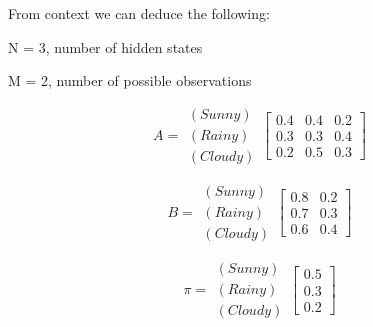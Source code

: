 \begin{example}
        From context we can deduce the following:
        \begin{center}
                    N = 3, number of hidden states

                    M = 2, number of possible observations

                    \begin{equation}
                    A = 
                    \begin{array}{c}
                        (Sunny) \\
                        (Rainy) \\
                        (Cloudy)
                    \end{array}
                    \begin{bmatrix}
                        0.4 & 0.4 & 0.2 \\
                        0.3 & 0.3 & 0.4 \\
                        0.2 & 0.5 & 0.3 
                        \end{bmatrix}
                    \end{equation}

                    \begin{equation}
                    B = 
                    \begin{array}{c}
                        (Sunny) \\
                        (Rainy) \\
                        (Cloudy)
                    \end{array}
                    \begin{bmatrix}
                        0.8 & 0.2 \\
                        0.7 & 0.3 \\
                        0.6 & 0.4 
                        \end{bmatrix}
                    \end{equation}

                    \begin{equation}
                    \pi = 
                    \begin{array}{c}
                        (Sunny) \\
                        (Rainy) \\
                        (Cloudy)
                    \end{array}
                    \begin{bmatrix}
                        0.5 \\
                        0.3 \\
                        0.2 
                        \end{bmatrix}
                    \end{equation}
        \end{center}


\end{example}
